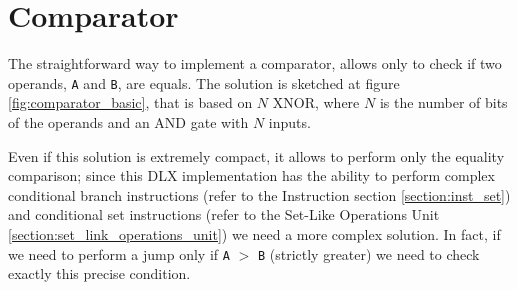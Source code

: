 \section{Comparator}
\label{sec:comparator}
The straightforward way to implement a comparator, allows only to check if two operands, \texttt{A} and \texttt{B}, are equals. The solution is sketched at figure \ref{fig:comparator_basic}, that is based on $N$ XNOR, where $N$ is the number of bits of the operands and an AND gate with $N$ inputs.

Even if this solution is extremely compact, it allows to perform only the equality comparison; since this DLX implementation has the ability to perform complex conditional branch instructions (refer to the Instruction section \ref{section:inst_set}) and conditional set instructions (refer to the Set-Like Operations Unit \ref{section:set_link_operations_unit}) we need a more complex solution. In fact, if we need to perform a jump only if \texttt{A} $>$ \texttt{B} (strictly greater) we need to check exactly this precise condition.

